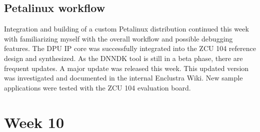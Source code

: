 \subsection{Petalinux workflow}
Integration and building of a custom Petalinux distribution continued this week with familiarizing myself with the overall workflow and possible debugging features. The \ac{DPU} \ac{IP} core was successfully integrated into the ZCU 104 reference design and synthesized. As the \ac{DNNDK} tool is still in a beta phase, there are frequent updates. A major update was released this week. This updated version was investigated and documented in the internal Enclustra Wiki. New sample applications were tested with the ZCU 104 evaluation board.

\section{Week 10}
